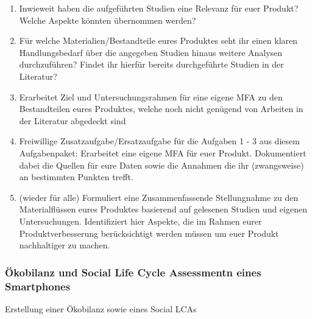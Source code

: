 \documentclass[headinclude=true]{scrartcl}
\begin{document}
	      \begin{enumerate}
		      \item
		            Inwieweit haben die aufgeführten Studien eine Relevanz für euer Produkt? Welche Aspekte könnten übernommen werden?
		     
		      \item
		            Für welche Materialien/Bestandteile eures Produktes seht ihr einen klaren Handlungsbedarf über die angegeben Studien hinaus weitere Analysen durchzuführen? Findet ihr hierfür bereits durchgeführte Studien in der Literatur?
                \item
            	      Erarbeitet Ziel und Untersuchungsrahmen für eine eigene MFA zu den Bestandteilen eures Produktes, welche noch nicht genügend von Arbeiten in der Literatur abgedeckt sind
            	      
    	      \item
    	           Freiwillige Zusatzaufgabe/Ersatzaufgabe für die Aufgaben 1 - 3 aus diesem Aufgabenpaket: Erarbeitet eine eigene MFA für euer Produkt. Dokumentiert dabei die Quellen für eure Daten sowie die Annahmen die ihr (zwangsweise) an bestimmten Punkten trefft.
        	      
    	      \item 
    	            (wieder für alle) Formuliert eine Zusammenfassende Stellungnahme zu den Materialflüssen eures Produktes basierend auf gelesenen Studien und eigenen Untersuchungen. Identifiziert hier Aspekte, die im Rahmen eurer Produktverbesserung berücksichtigt werden müssen um euer Produkt nachhaltiger zu machen.
	      \end{enumerate}
	

\subsubsection{Ökobilanz und Social Life Cycle Assessmentn eines Smartphones}
\label{ökobilanz}

Erstellung einer Ökobilanz sowie eines Social LCAs
\end{document}
